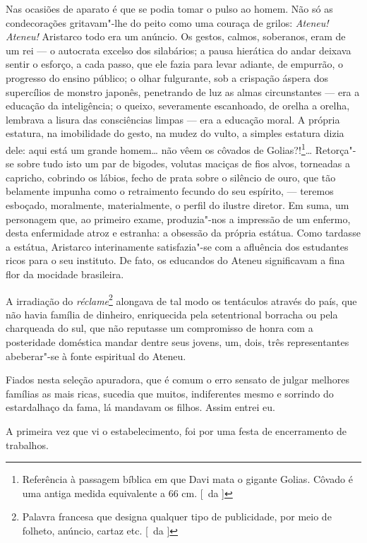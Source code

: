 Nas ocasiões de aparato é que se podia tomar o pulso ao homem. 
Não só as condecorações
gritavam"-lhe do peito como uma couraça de grilos: \textit{Ateneu!} \textit{Ateneu!}
Aristarco todo era um anúncio. Os gestos, calmos, soberanos, eram de um
rei --- o autocrata excelso dos silabários; a pausa hierática do andar
deixava sentir o esforço, a cada passo, que ele fazia para levar
adiante, de empurrão, o progresso do ensino público; o olhar
fulgurante, sob a crispação áspera dos supercílios de monstro japonês,
penetrando de luz as almas circunstantes --- era a educação da
inteligência; o queixo, severamente escanhoado, de orelha a orelha,
lembrava a lisura das consciências limpas --- era a educação moral. A
própria estatura, na imobilidade do gesto, na mudez do vulto, a simples
estatura dizia dele: aqui está um grande homem\ldots{} não vêem os 
côvados de Golias?!\footnote{ Referência à passagem bíblica em que Davi mata o gigante Golias. 
Côvado é uma antiga medida equivalente a 66 cm. [~da ]}\ldots{} 
Retorça"-se sobre tudo isto um par de 
bigodes, volutas maciças de fios alvos, torneadas a capricho, cobrindo os lábios, fecho
de prata sobre o silêncio de ouro, que tão belamente impunha como o
retraimento fecundo do seu espírito, --- teremos esboçado, moralmente,
materialmente, o perfil do ilustre diretor. Em suma, um personagem que,
ao primeiro exame, produzia"-nos a impressão de um enfermo, desta
enfermidade atroz e estranha: a obsessão da própria estátua. Como
tardasse a estátua, Aristarco interinamente satisfazia"-se com a
afluência dos estudantes ricos para o seu instituto. De fato, os
educandos do Ateneu significavam a fina flor da mocidade brasileira. 

A irradiação do \textit{réclame}\footnote{ Palavra francesa que designa 
qualquer tipo de publicidade, por meio de folheto, anúncio, cartaz etc. 
[~da ]} alongava de tal modo os tentáculos através do
país, que não havia família de dinheiro, enriquecida pela setentrional
borracha ou pela charqueada do sul, que não reputasse um compromisso de
honra com a posteridade doméstica mandar dentre seus jovens, um, dois,
três representantes abeberar"-se à fonte espiritual do Ateneu. 

Fiados nesta seleção apuradora, que é comum o erro sensato de julgar melhores
famílias as mais ricas, sucedia que muitos, indiferentes mesmo e
sorrindo do estardalhaço da fama, lá mandavam os filhos. Assim entrei eu. 

A primeira vez que vi o estabelecimento, foi por uma festa de
encerramento de trabalhos. 

